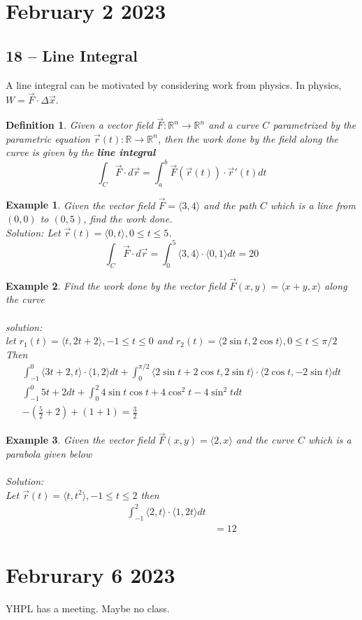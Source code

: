 \documentclass[11pt]{article}
\newtheorem{defn}{Definition}
\newtheorem{ex}{Example}
\begin{document}
\section{February 2 2023}
\subsection{18 -- Line Integral}
A line integral can be motivated by considering work from physics. In physics, $W = \vec{F} \cdot \Delta\vec{ x}$.
\begin{defn}
  Given a vector field $\vec{F} : \mathbb{R}^{n} \to \mathbb{R}^{n}$ and a curve $C$ parametrized by the parametric equation
  $\vec{r}(t) : \mathbb{R} \to \mathbb{R}^{n}$, then the work done by the field along the curve is given by the \textbf{line integral}
  \[\int_{C} \vec{F} \cdot d\vec{r} = \int_{a}^{b} \vec{F}(\vec{r}(t)) \cdot \vec{r} '(t) dt\]
\end{defn}
\begin{ex}
  Given the vector field $\vec{F} = \langle 3, 4 \rangle$ and the path $C$ which is a line from
  $(0, 0)$ to $(0, 5)$, find the work done. \\
  Solution:
  Let $\vec{r}(t) = \langle 0, t \rangle, 0 \le t \le 5$.
  \[\int_{C} \vec{F} \cdot d\vec{r} = \int_{0}^{5} \langle 3, 4\rangle \cdot \langle 0, 1 \rangle dt
   = 20\]
\end{ex}
\begin{ex}
  Find the work done by the vector field $\vec{F}(x,y) = \langle x+ y, x \rangle$
  along the curve\\
  \\
  solution: \\
  let $r_{1}(t) = \langle t,  2t + 2 \rangle, -1 \le t \le 0$
  and $r_{2}(t) = \langle 2\sin t, 2\cos t \rangle, 0 \le t \le \pi/2 $
  Then
\begin{align*}
  \int_{-1}^{0} \langle 3t + 2, t \rangle \cdot \langle 1, 2 \rangle dt
  + \int_{0}^{\pi/2} \langle 2 \sin t + 2 \cos t, 2 \sin t \rangle \cdot \langle 2 \cos t, -2 \sin t \rangle dt\\
  \int_{-1}^{0} 5t + 2 dt + \int_{0}^{2} 4 \sin t \cos t + 4 \cos^{2} t - 4 \sin^{2} t dt \\
  -(\frac{5}{2} + 2) + (1 + 1 ) = \frac{3}{2}
\end{align*}

\end{ex}
\begin{ex}
  Given the vector field $\vec{F}(x,y) = \langle 2 , x \rangle$ and the curve $C$ which is a parabola given below\\
  \\
  Solution: \\
  Let $\vec{r}(t) = \langle t, t^{2} \rangle, -1 \le t \le 2$
  then
  \begin{align*}
    \int_{-1}^{2} \langle 2, t \rangle \cdot \langle 1, 2t \rangle dt \\
    &= 12
  \end{align*}
\end{ex}

\section{Februrary 6 2023}
YHPL has a meeting. Maybe no class.
\end{document}
